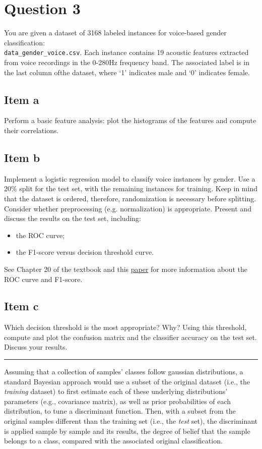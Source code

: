 \section{Question 3}
    You are given a dataset of 3168 labeled instances for voice-based gender classification:\\
    \texttt{data\_gender\_voice.csv}. 
    Each instance contains 19 acoustic features extracted from voice recordings in the 0-280Hz frequency band. 
    The associated label is in the last column ofthe dataset, where `1' indicates male and `0' indicates female.

    \subsection{Item a}
    Perform a basic feature analysis: plot the histograms of the features and compute their correlations. 

    \subsection{Item b}
    Implement a logistic regression model to classify voice instances  by gender. 
    Use a 20\% split for the test set, with the remaining instances for training. 
    Keep in mind that the dataset is ordered, therefore, randomization is necessary before splitting. 
    Consider whether  preprocessing  (e.g. normalization)  is appropriate. 
    Present and discuss the results on the test set, including:
    \begin{itemize}
        \item the ROC curve;
        \item the F1-score versus decision threshold curve.
    \end{itemize}
    See Chapter 20 of the textbook and this \href{https://www.sciencedirect.com/science/article/abs/pii/S0306457309000259}{paper} for more information about the ROC curve and F1-score.
    
    \subsection{Item c}
    Which decision threshold is the most appropriate? 
    Why? 
    Using this threshold, compute and plot the confusion matrix and the classifier accuracy on the test set.
    Discuss your results.
    
\noindent\rule{\textwidth}{.5pt}

Assuming that a collection of samples' classes follow gaussian distributions, 
a standard Bayesian approach would use a subset of the original dataset
(i.e., the \textit{training} dataset) 
to first estimate each of these underlying distributions' parameters
(e.g., covariance matrix),
as well as prior probabilities of each distribution, 
to tune a discriminant function.
%
Then, with a subset from the original samples different than the training set (i.e., the \textit{test} set),
the discriminant is applied sample by sample and its results, 
the degree of belief that the sample belongs to a class,
compared with the associated original classification.

